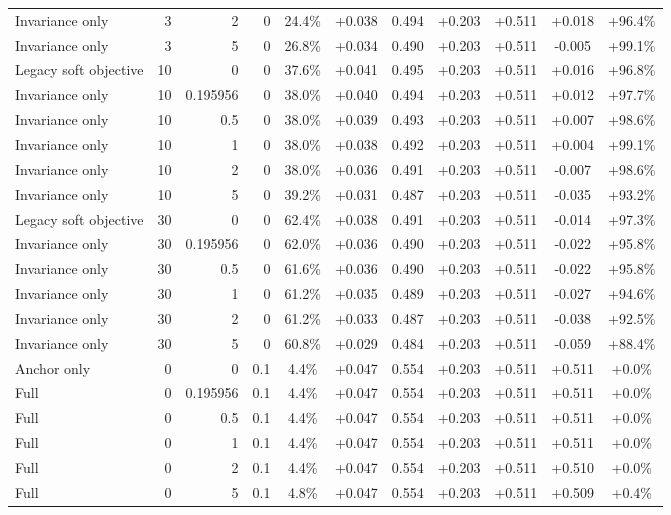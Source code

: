\begin{table}[htbp]
\begin{tabular}{lrrrccccccc}
Invariance only & 3 & 2 & 0 & 24.4\% & +0.038 & 0.494 & +0.203 & +0.511 & +0.018 & +96.4\% \\
Invariance only & 3 & 5 & 0 & 26.8\% & +0.034 & 0.490 & +0.203 & +0.511 & -0.005 & +99.1\% \\
Legacy soft objective & 10 & 0 & 0 & 37.6\% & +0.041 & 0.495 & +0.203 & +0.511 & +0.016 & +96.8\% \\
Invariance only & 10 & 0.195956 & 0 & 38.0\% & +0.040 & 0.494 & +0.203 & +0.511 & +0.012 & +97.7\% \\
Invariance only & 10 & 0.5 & 0 & 38.0\% & +0.039 & 0.493 & +0.203 & +0.511 & +0.007 & +98.6\% \\
Invariance only & 10 & 1 & 0 & 38.0\% & +0.038 & 0.492 & +0.203 & +0.511 & +0.004 & +99.1\% \\
Invariance only & 10 & 2 & 0 & 38.0\% & +0.036 & 0.491 & +0.203 & +0.511 & -0.007 & +98.6\% \\
Invariance only & 10 & 5 & 0 & 39.2\% & +0.031 & 0.487 & +0.203 & +0.511 & -0.035 & +93.2\% \\
Legacy soft objective & 30 & 0 & 0 & 62.4\% & +0.038 & 0.491 & +0.203 & +0.511 & -0.014 & +97.3\% \\
Invariance only & 30 & 0.195956 & 0 & 62.0\% & +0.036 & 0.490 & +0.203 & +0.511 & -0.022 & +95.8\% \\
Invariance only & 30 & 0.5 & 0 & 61.6\% & +0.036 & 0.490 & +0.203 & +0.511 & -0.022 & +95.8\% \\
Invariance only & 30 & 1 & 0 & 61.2\% & +0.035 & 0.489 & +0.203 & +0.511 & -0.027 & +94.6\% \\
Invariance only & 30 & 2 & 0 & 61.2\% & +0.033 & 0.487 & +0.203 & +0.511 & -0.038 & +92.5\% \\
Invariance only & 30 & 5 & 0 & 60.8\% & +0.029 & 0.484 & +0.203 & +0.511 & -0.059 & +88.4\% \\
Anchor only & 0 & 0 & 0.1 & 4.4\% & +0.047 & 0.554 & +0.203 & +0.511 & +0.511 & +0.0\% \\
Full & 0 & 0.195956 & 0.1 & 4.4\% & +0.047 & 0.554 & +0.203 & +0.511 & +0.511 & +0.0\% \\
Full & 0 & 0.5 & 0.1 & 4.4\% & +0.047 & 0.554 & +0.203 & +0.511 & +0.511 & +0.0\% \\
Full & 0 & 1 & 0.1 & 4.4\% & +0.047 & 0.554 & +0.203 & +0.511 & +0.511 & +0.0\% \\
Full & 0 & 2 & 0.1 & 4.4\% & +0.047 & 0.554 & +0.203 & +0.511 & +0.510 & +0.0\% \\
Full & 0 & 5 & 0.1 & 4.8\% & +0.047 & 0.554 & +0.203 & +0.511 & +0.509 & +0.4\% \\

\end{tabular}
\end{table}
